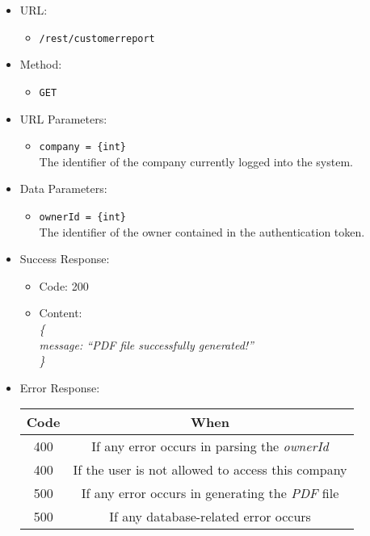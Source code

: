 \begin{itemize}

    \item URL:
    \begin{itemize}
        \item \texttt{/rest/customerreport}
    \end{itemize}

    \item Method:
    \begin{itemize}
        \item \texttt{GET}
    \end{itemize}

    \item URL Parameters:
    \begin{itemize}
        \item \texttt{company = \{int\}} \\
        The identifier of the company currently logged into the system.
    \end{itemize}

    \item Data Parameters:
    \begin{itemize}
        \item \texttt{ownerId = \{int\}} \\
        The identifier of the owner contained in the authentication token.
    \end{itemize}

    \item Success Response:
    \begin{itemize}
        \item Code: 200
        \item Content: \\
        \textit{
\{ \\
    message: “PDF file successfully generated!” \\
\}
        }
    \end{itemize}

    \item Error Response:
    \begin{table}[!h]
    \centering
    \begin{tabular}{|c|c|}
    \hline
    \multicolumn{1}{|c|}{\textbf{Code}} & \multicolumn{1}{c|}{\textbf{When}} \\ \hline
    400 & If any error occurs in parsing the \textit{ownerId}  \\\hline
    400 & If the user is not allowed to access this company \\\hline
    500 & If any error occurs in generating the \textit{PDF} file \\\hline
    500 & If any database-related error occurs \\\hline
    \end{tabular}
    \end{table}

\end{itemize}


